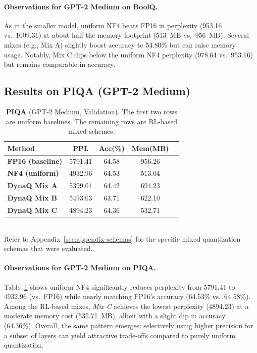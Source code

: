 \documentclass{article}
\begin{document}
	\paragraph{Observations for GPT-2 Medium on BoolQ.}
	As in the smaller model, uniform NF4 beats FP16 in perplexity (953.16 vs.\ 1009.31) at about half the memory footprint (513~MB vs.\ 956~MB). Several mixes (e.g., Mix A) slightly boost accuracy to 54.80\% but can raise memory usage. Notably, Mix C dips below the uniform NF4 perplexity (978.64 vs.\ 953.16) but remains comparable in accuracy.
	
	\subsection{Results on PIQA (GPT-2 Medium)}
	\label{sec:piqa-medium}
	
	\begin{table}[ht]
		\centering
		\caption{\small \textbf{PIQA} (GPT-2 Medium, Validation). The first two rows are uniform baselines. The remaining rows are RL-based mixed schemes.}
		\label{tab:piqa-medium}
		\begin{tabular}{lcccc}
			\toprule
			\textbf{Method} & \textbf{PPL} & \textbf{Acc(\%)} & \textbf{Mem(MB)} \\
			\midrule
			\textbf{FP16 (baseline)} & 5791.41 & 64.58 & 956.26 \\
			\textbf{NF4 (uniform)}   & 4932.96 & 64.53 & 513.04 \\
			\midrule
			\textbf{DynaQ Mix A}     & 5399.04 & 64.42 & 694.23 \\
			\textbf{DynaQ Mix B}     & 5493.03 & 63.71 & 622.10 \\
			\textbf{DynaQ Mix C}     & 4894.23 & 64.36 & 532.71 \\
			\bottomrule
		\end{tabular}
		\vspace{-1em}
	\end{table}
	
	
	\textbf{}
	\\
	\small{Refer to Appendix~\ref{sec:appendix-schemas} for the specific mixed quantization schemas that were evaluated.}
	
	
	\paragraph{Observations for GPT-2 Medium on PIQA.}
	Table~\ref{tab:piqa-medium} shows uniform NF4 significantly reduces perplexity from 5791.41 to 4932.96 (vs.\ FP16) while nearly matching FP16's accuracy (64.53\% vs.\ 64.58\%). Among the RL-based mixes, \emph{Mix C} achieves the lowest perplexity (4894.23) at a moderate memory cost (532.71~MB), albeit with a slight dip in accuracy (64.36\%). Overall, the same pattern emerges: selectively using higher precision for a subset of layers can yield attractive trade-offs compared to purely uniform quantization.
	
\end{document}
